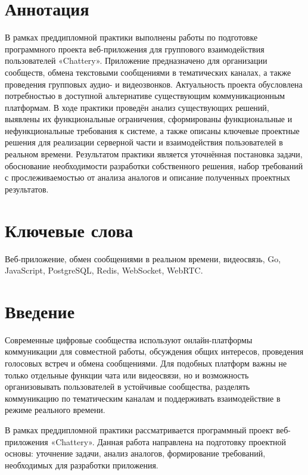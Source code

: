 \documentclass[a4paper,12pt]{extarticle}
\begin{document}
\setcounter{page}{2}

{
	\hypersetup{linkcolor=black}
	\tableofcontents
}

\newpage

\newpage
\section*{Аннотация}

В рамках преддипломной практики выполнены работы по подготовке программного проекта веб-приложения для группового взаимодействия пользователей «Chattery».
Приложение предназначено для организации сообществ, обмена текстовыми сообщениями в тематических каналах, а также проведения групповых аудио- и видеозвонков.
Актуальность проекта обусловлена потребностью в доступной альтернативе существующим коммуникационным платформам. В ходе практики проведён анализ существующих решений, выявлены их функциональные ограничения, сформированы функциональные и нефункциональные требования к системе, а также описаны ключевые проектные решения для реализации серверной части и взаимодействия пользователей в реальном времени.
Результатом практики является уточнённая постановка задачи, обоснование необходимости разработки собственного решения, набор требований с прослеживаемостью от анализа аналогов и описание полученных проектных результатов.


\section*{Ключевые слова}
Веб-приложение, обмен сообщениями в реальном времени, видеосвязь, Go, JavaScript, PostgreSQL, Redis, WebSocket, WebRTC.
\pagebreak

\section{Введение}

Современные цифровые сообщества используют онлайн-платформы коммуникации для совместной работы, обсуждения общих интересов, проведения голосовых встреч и обмена сообщениями. Для подобных платформ важны не только отдельные функции чата или видеосвязи, но и возможность организовывать пользователей в устойчивые сообщества, разделять коммуникацию по тематическим каналам и поддерживать взаимодействие в режиме реального времени.

В рамках преддипломной практики рассматривается программный проект веб-прило\-жения «Chattery». Данная работа направлена на подготовку проектной основы: уточнение задачи, анализ аналогов, формирование требований, необходимых для разработки приложения.
\end{document}
